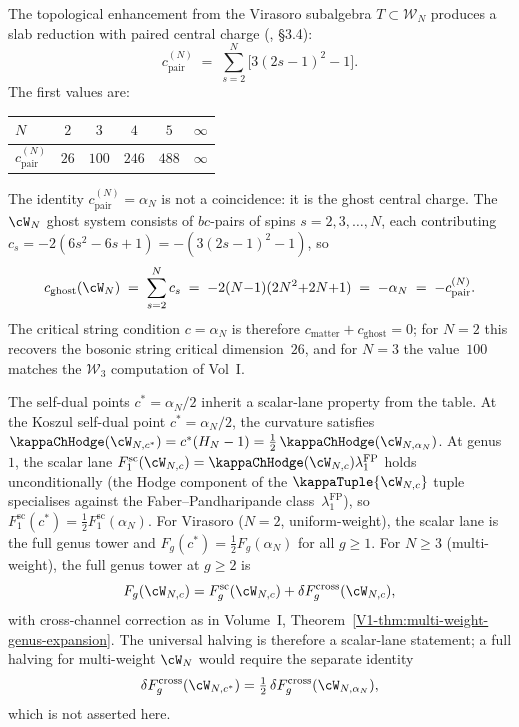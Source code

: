 \begin{proposition}
\label{prop:wn-slab-central-charges}
The topological enhancement from the Virasoro subalgebra $T \subset
\mathcal{W}_N$ produces a slab reduction with paired central charge
\textup{(}\!\cite{KZ25}, \S3.4\textup{)}:
\begin{equation}\label{eq:wn-cpair}
c_{\mathrm{pair}}^{(N)}
\;=\;
\sum_{s=2}^{N} \bigl[3(2s-1)^2 - 1\bigr].
\end{equation}
The first values are:
\begin{center}
\renewcommand{\arraystretch}{1.2}
\begin{tabular}{lccccc}
\toprule
$N$ & $2$ & $3$ & $4$ & $5$ & $\infty$ \\
\midrule
$c_{\mathrm{pair}}^{(N)}$ & $26$ & $100$ & $246$ & $488$ & $\infty$ \\
\bottomrule
\end{tabular}
\end{center}
The identity $c_{\mathrm{pair}}^{(N)} = \alpha_N$%
%
{} is not a coincidence: it is the ghost central
charge.\label{prop:ghost-identity-alphaN-active}
The $\cW_N$ ghost system consists of $bc$-pairs of spins
$s = 2, 3, \ldots, N$, each contributing
$c_s = -2(6s^2 - 6s + 1) = -(3(2s-1)^2 - 1)$, so
\[
c_{\mathrm{ghost}}(\cW_N)
\;=\; \sum_{s=2}^{N} c_s
\;=\; -2(N{-}1)(2N^2{+}2N{+}1)
\;=\; -\alpha_N
\;=\; -c_{\mathrm{pair}}^{(N)}.
\]
The critical string condition $c = \alpha_N$ is therefore
$c_{\mathrm{matter}} + c_{\mathrm{ghost}} = 0$;
for $N = 2$ this recovers the bosonic string critical dimension~$26$,
and for $N = 3$ the value~$100$ matches the $\mathcal{W}_3$ computation
of Vol~I.

The self-dual points $c^* = \alpha_N/2$ inherit a scalar-lane
property from the table.\label{prop:self-dual-halving}%
At the Koszul self-dual point $c^* = \alpha_N/2$, the
curvature satisfies
$\kappaChHodge(\cW_{N,c^*}) = c^*(H_N - 1) = \tfrac{1}{2}\,\kappaChHodge(\cW_{N,\alpha_N})$.
At genus~$1$, the scalar lane
$F_1^{\mathrm{sc}}(\cW_{N,c}) =
\kappaChHodge(\cW_{N,c})\lambda_1^{\mathrm{FP}}$
holds unconditionally (the Hodge component of the
$\kappaTuple{\cW_{N,c}}$ tuple specialises against the
Faber--Pandharipande class~$\lambda_1^{\mathrm{FP}}$),
so
$F_1^{\mathrm{sc}}(c^*) =
\tfrac{1}{2}F_1^{\mathrm{sc}}(\alpha_N)$.
For Virasoro ($N = 2$, uniform-weight), the scalar lane is the full
genus tower and
$F_g(c^*)=\tfrac12F_g(\alpha_N)$ for all $g\ge1$. For
$N \ge 3$ (multi-weight), the full genus tower at $g\ge2$ is
\[
F_g(\cW_{N,c})
 =
 F_g^{\mathrm{sc}}(\cW_{N,c})
 +\delta F_g^{\mathrm{cross}}(\cW_{N,c}),
\]
with cross-channel correction as in Volume~I,
Theorem~\ref{V1-thm:multi-weight-genus-expansion}.  The universal
halving is therefore a scalar-lane statement; a full halving for
multi-weight $\cW_N$ would require the separate identity
\[
\delta F_g^{\mathrm{cross}}(\cW_{N,c^*})
=\tfrac12\,\delta F_g^{\mathrm{cross}}(\cW_{N,\alpha_N}),
\]
which is not asserted here.
\end{proposition}


